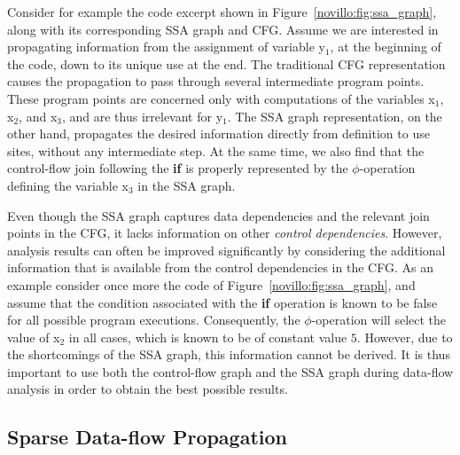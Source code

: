 Consider for example the code excerpt shown in
Figure~\ref{novillo:fig:ssa_graph}, along with its corresponding SSA graph and
CFG. Assume we are interested in propagating information from the assignment of
variable y$_1$, at the beginning of the code, down to its unique use at
the end. The traditional CFG representation causes the propagation
to pass through several intermediate program points. These program points are
concerned only with computations of the variables x$_1$, x$_2$, and x$_3$, and
are thus irrelevant for y$_1$. The SSA graph representation, on
the other hand, propagates the desired information directly from definition to
use sites, without
any intermediate step. At the same time, we also find that the control-flow
join following the \textbf{if} is properly represented by the $\phi$-operation
defining the variable x$_3$ in the SSA graph.

Even though the SSA graph captures data dependencies and the relevant join
points in the CFG, it lacks information on other
\emph{control dependencies}. However, analysis results can often be improved
significantly by considering the additional information that is available from
the control dependencies in the CFG. As an example consider once more
the code of Figure~\ref{novillo:fig:ssa_graph}, and assume that the
condition associated with the \textbf{if} operation is known to be false for all
possible program executions. Consequently, the $\phi$-operation will select the
value of x$_2$ in all cases, which is known to be of constant value $5$.
However, due to the shortcomings of the SSA graph, this information cannot be
derived. It is thus important to use both the control-flow graph and the SSA
graph during data-flow analysis in order to obtain the best possible results.

\subsection{Sparse Data-flow Propagation}

